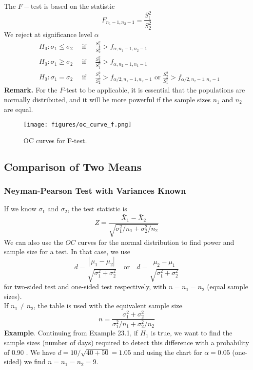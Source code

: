 \documentclass[a4paper,12pt]{article}
\begin{document}
\noindent The $F-$test is based on the statistic
\begin{equation}
    F_{n_1-1, n_2-1}=\frac{S_1^2}{S_2^2}
    \end{equation}
    We reject at significance level $\alpha$
    $$
    \begin{aligned}
    & H_0: \sigma_1 \leq \sigma_2 \quad \text { if } \quad  \frac{S_1^2}{S_2^2}>f_{\alpha, n_1-1, n_2-1} \\
    & H_0: \sigma_1 \geq \sigma_2 \quad \text { if } \quad \frac{S_2^2}{S_1^2}>f_{\alpha, n_2-1, n_1-1} \\
    & H_0: \sigma_1=\sigma_2 \quad \text { if } \quad  \frac{S_1^2}{S_2^2}>f_{\alpha / 2, n_1-1, n_2-1} \text { or } \frac{S_2^2}{S_1^2}>f_{\alpha / 2, n_2-1, n_1-1}
    \end{aligned}
    $$
    \textbf{Remark.} For the $F$-test to be applicable, it is essential that the populations are normally distributed, and it will be more powerful if the sample sizes $n_1$ and $n_2$ are equal.
    \begin{figure}[h] 
        \centering
        \texttt{[image: figures/oc\_curve\_f.png]} 
        \caption{OC curves for F-test.} 
    \end{figure}

\subsection{Comparison of Two Means}
\subsubsection{Neyman-Pearson Test with Variances Known}
If we know $\sigma_1$ and $\sigma_2$, the test statistic is
\begin{equation}
    Z=\frac{\bar{X}_1-\bar{X}_2}{\sqrt{\sigma_1^2 / n_1+\sigma_2^2 / n_2}}
    \end{equation}
    We can also use the $O C$ curves for the normal distribution to find power and sample size for a test. In that case, we use
    $$
    d=\frac{\left|\mu_1-\mu_2\right|}{\sqrt{\sigma_1^2+\sigma_2^2}} \quad \text{or} \quad     d=\frac{\mu_2-\mu_1}{\sqrt{\sigma_1^2+\sigma_2^2}}
    $$
    for two-sided test and one-sided test respectively, with $n=n_1=n_2$ (equal sample sizes).\\
    If $n_1 \neq n_2$, the table is used with the equivalent sample size
    $$
    n=\frac{\sigma_1^2+\sigma_2^2}{\sigma_1^2 / n_1+\sigma_2^2 / n_2}
    $$
    \textbf{Example}. Continuing from Example 23.1, if $H_1$ is true, we want to find the sample sizes (number of days) required to detect this difference with a probability of 0.90 .
We have $d=10 / \sqrt{40+50}=1.05$ and using the chart for $\alpha=0.05$ (one-sided) we find $n=n_1=n_2=9$.\\
\end{document}
